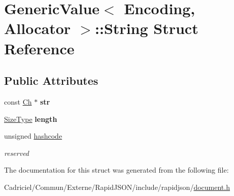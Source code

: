 \hypertarget{struct_generic_value_1_1_string}{}\section{Generic\+Value$<$ Encoding, Allocator $>$\+:\+:String Struct Reference}
\label{struct_generic_value_1_1_string}
\subsection*{Public Attributes}
\begin{DoxyCompactItemize}
\item 
const \hyperlink{class_generic_value_ade0e0ce64ccd5d852da57a35e720bafb}{Ch} $\ast$ {\bfseries str}\hypertarget{struct_generic_value_1_1_string_a4eebc5acf3f93ab833efd82abf3ba84d}{}\label{struct_generic_value_1_1_string_a4eebc5acf3f93ab833efd82abf3ba84d}

\item 
\hyperlink{rapidjson_8h_a5ed6e6e67250fadbd041127e6386dcb5}{Size\+Type} {\bfseries length}\hypertarget{struct_generic_value_1_1_string_ad6ffab0e093aa8db6e415812ff6443bf}{}\label{struct_generic_value_1_1_string_ad6ffab0e093aa8db6e415812ff6443bf}

\item 
unsigned \hyperlink{struct_generic_value_1_1_string_a3f1da673591f850e425184f2d8495d66}{hashcode}\hypertarget{struct_generic_value_1_1_string_a3f1da673591f850e425184f2d8495d66}{}\label{struct_generic_value_1_1_string_a3f1da673591f850e425184f2d8495d66}

\begin{DoxyCompactList}\small\item\em reserved \end{DoxyCompactList}\end{DoxyCompactItemize}


The documentation for this struct was generated from the following file\+:\begin{DoxyCompactItemize}
\item 
Cadriciel/\+Commun/\+Externe/\+Rapid\+J\+S\+O\+N/include/rapidjson/\hyperlink{document_8h}{document.\+h}\end{DoxyCompactItemize}
